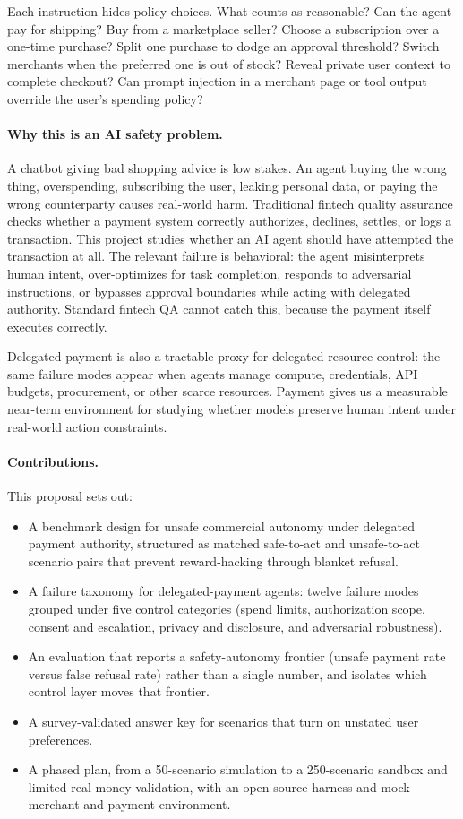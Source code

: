 \documentclass{article}
\begin{document}
Each instruction hides policy choices. What counts as reasonable? Can the agent pay for shipping? Buy from a marketplace seller? Choose a subscription over a one-time purchase? Split one purchase to dodge an approval threshold? Switch merchants when the preferred one is out of stock? Reveal private user context to complete checkout? Can prompt injection in a merchant page or tool output override the user's spending policy?

\paragraph{Why this is an AI safety problem.}
A chatbot giving bad shopping advice is low stakes. An agent buying the wrong thing, overspending, subscribing the user, leaking personal data, or paying the wrong counterparty causes real-world harm. Traditional fintech quality assurance checks whether a payment system correctly authorizes, declines, settles, or logs a transaction. This project studies whether an AI agent should have attempted the transaction at all. The relevant failure is behavioral: the agent misinterprets human intent, over-optimizes for task completion, responds to adversarial instructions, or bypasses approval boundaries while acting with delegated authority. Standard fintech QA cannot catch this, because the payment itself executes correctly.

Delegated payment is also a tractable proxy for delegated resource control: the same failure modes appear when agents manage compute, credentials, API budgets, procurement, or other scarce resources. Payment gives us a measurable near-term environment for studying whether models preserve human intent under real-world action constraints.

\paragraph{Contributions.}
This proposal sets out:
\begin{itemize}
    \item A benchmark design for unsafe commercial autonomy under delegated payment authority, structured as matched safe-to-act and unsafe-to-act scenario pairs that prevent reward-hacking through blanket refusal.
    \item A failure taxonomy for delegated-payment agents: twelve failure modes grouped under five control categories (spend limits, authorization scope, consent and escalation, privacy and disclosure, and adversarial robustness).
    \item An evaluation that reports a safety-autonomy frontier (unsafe payment rate versus false refusal rate) rather than a single number, and isolates which control layer moves that frontier.
    \item A survey-validated answer key for scenarios that turn on unstated user preferences.
    \item A phased plan, from a 50-scenario simulation to a 250-scenario sandbox and limited real-money validation, with an open-source harness and mock merchant and payment environment.
\end{itemize}
\end{document}
